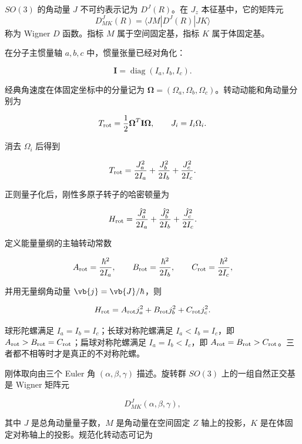 \begin{definition}
\(SO(3)\) 的角动量 \(J\) 不可约表示记为 \(D^J(R)\)。在
\(J_z\) 本征基中，它的矩阵元
\[
D^J_{MK}(R)=\langle JM|D^J(R)|JK\rangle
\]
称为 Wigner \(D\) 函数。指标 \(M\) 属于空间固定基，指标
\(K\) 属于体固定基。
\end{definition}

在分子主惯量轴 \(a,b,c\) 中，惯量张量已经对角化：

\[
\mathbf I
=\operatorname{diag}(I_a,I_b,I_c).
\]

经典角速度在体固定坐标中的分量记为 \(\boldsymbol\Omega=(\Omega_a,\Omega_b,\Omega_c)\)。转动动能和角动量分别为

\[
T_{\rm rot}
=\frac12\boldsymbol\Omega^T\mathbf I\boldsymbol\Omega,
\qquad
J_i=I_i\Omega_i.
\]

消去 \(\Omega_i\) 后得到

\[
T_{\rm rot}
=\frac{J_a^2}{2I_a}
+\frac{J_b^2}{2I_b}
+\frac{J_c^2}{2I_c}.
\]

正则量子化后，刚性多原子转子的哈密顿量为

\begin{equation}
H_{\rm rot}
=\frac{\hat J_a^2}{2I_a}
+\frac{\hat J_b^2}{2I_b}
+\frac{\hat J_c^2}{2I_c}.
\label{eq:asymmetric-top-hamiltonian}
\end{equation}

定义能量量纲的主轴转动常数

\[
A_{\rm rot}=\frac{\hbar^2}{2I_a},
\qquad
B_{\rm rot}=\frac{\hbar^2}{2I_b},
\qquad
C_{\rm rot}=\frac{\hbar^2}{2I_c},
\]

并用无量纲角动量 \(\vb{j}=\vb{J}/\hbar\)，则

\begin{equation}
H_{\rm rot}
=A_{\rm rot}j_a^2+B_{\rm rot}j_b^2+C_{\rm rot}j_c^2.
\label{eq:asymmetric-top-energy-form}
\end{equation}

球形陀螺满足 \(I_a=I_b=I_c\)；长球对称陀螺满足 \(I_a<I_b=I_c\)，即 \(A_{\rm rot}>B_{\rm rot}=C_{\rm rot}\)；扁球对称陀螺满足 \(I_a=I_b<I_c\)，即 \(A_{\rm rot}=B_{\rm rot}>C_{\rm rot}\)。三者都不相等时才是真正的不对称陀螺。

刚体取向由三个 Euler 角 \((\alpha,\beta,\gamma)\) 描述。旋转群 \(SO(3)\) 上的一组自然正交基是 Wigner 矩阵元

\[
D^J_{MK}(\alpha,\beta,\gamma),
\]

其中 \(J\) 是总角动量量子数，\(M\) 是角动量在空间固定 \(Z\) 轴上的投影，\(K\) 是在体固定对称轴上的投影。规范化转动态可记为

